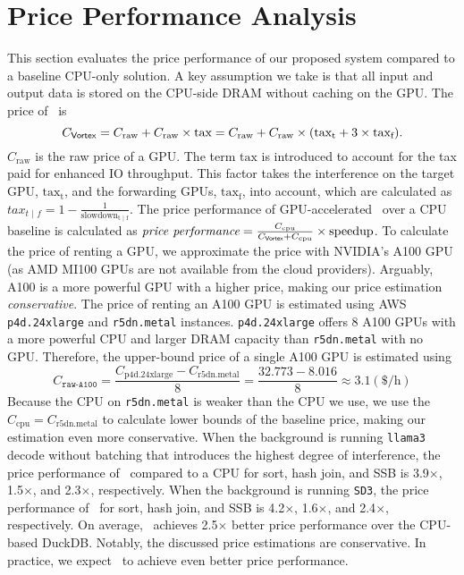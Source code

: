 \section{Price Performance Analysis} \label{section:cost_analysis}
This section evaluates the price performance of our proposed system compared to a baseline CPU-only solution.
A key assumption we take is that all input and output data is stored on the CPU-side DRAM without caching on the GPU.
The price of \THISWORK\ is 
$$
C_{\text{\THISWORK}} = C_\text{raw} + C_{\text{raw}} \times \text{tax} = C_\text{raw} +  C_{\text{raw}} \times (\text{tax}_{\text{t}} + 3 \times \text{tax}_{\text{f}}).
$$
$C_{\text{raw}}$ is the raw price of a GPU.
The term $\text{tax}$ is introduced to account for the tax paid for enhanced IO throughput.
This factor takes the interference on the target GPU, $\text{tax}_{\text{t}}$, and the forwarding GPUs,  $\text{tax}_{\text{f}}$, into account, which are calculated as $ \textit{tax}_{\textit{t | f}} = 1 - \frac{1}{\text{slowdown}_\text{t | f}} $.
The price performance of GPU-accelerated \THISWORK\ over a CPU baseline is calculated as $ \textit{price performance} = \frac{C_\text{cpu}}{C_\text{\THISWORK} + C_\text{cpu}} \times \text{speedup} $.
To calculate the price of renting a GPU, we approximate the price with NVIDIA's A100 GPU (as AMD MI100 GPUs are not available from the cloud providers).
Arguably, A100 is a more powerful GPU with a higher price, making our price estimation \textit{conservative}.
The price of renting an A100 GPU is estimated using AWS \texttt{p4d.24xlarge} and \texttt{r5dn.metal} instances.
\texttt{p4d.24xlarge} offers 8 A100 GPUs with a more powerful CPU and larger DRAM capacity than \texttt{r5dn.metal} with no GPU.
Therefore, the upper-bound price of a single A100 GPU is estimated using
$$
C_{\texttt{raw-A100}} = \frac{C_{\text{p4d.24xlarge}} - C_{\text{r5dn.metal}}}{8} = \frac{32.773 - 8.016}{8} \approx 3.1 (\$/\text{h})
$$
Because the CPU on \texttt{r5dn.metal} is weaker than the CPU we use, we use the $C_\text{cpu} = C_\text{r5dn.metal}$ to calculate lower bounds of the baseline price, making our estimation even more conservative.
When the background is running \texttt{llama3} decode without batching that introduces the highest degree of interference, the price performance of \THISWORK\ compared to a CPU for sort, hash join, and SSB is 3.9$\times$, 1.5$\times$, and 2.3$\times$, respectively.
When the background is running \texttt{SD3}, the price performance of \THISWORK\ for sort, hash join, and SSB is 4.2$\times$, 1.6$\times$, and 2.4$\times$, respectively.
On average, \THISWORK\ achieves 2.5$\times$ better price performance over the CPU-based DuckDB.
Notably, the discussed price estimations are conservative. In practice, we expect \THISWORK\ to achieve even better price performance.